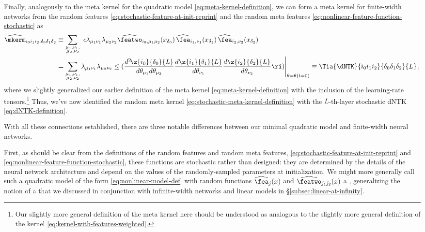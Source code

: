 Finally, analogously to the meta kernel for the quadratic model \eqref{eq:meta-kernel-definition}, we can form a meta kernel for finite-width networks from the random features  \eqref{eq:stochastic-feature-at-init-reprint} and the random meta features \eqref{eq:nonlinear-feature-function-stochastic} as
\begin{align}\label{eq:stochastic-meta-kernel-definition}
\widehat{\mkerm}_{i_0 i_1 i_2; \delta_0\delta_1\delta_2} &\equiv \sum_{\substack{\mu_1,\nu_1, \\ \mu_2,\nu_2} }\ \epsilon \lambda_{\mu_1\nu_1}\lambda_{\mu_2\nu_2} \widehat{\featwo}_{i_0,\mu_1\mu_2}(x_{\delta_0})\, \widehat{\fea}_{i_1,\nu_1}(x_{\delta_1} ) \,\widehat{\fea}_{i_2,\nu_2}(x_{\delta_2}) \\
&=\sum_{\substack{\mu_1,\nu_1, \\ \mu_2,\nu_2} }\lambda_{\mu_1\nu_1}\lambda_{\mu_2\nu_2}\le( \frac{d^2\!\z{i_0}{\delta_0}{L}}{d\theta_{\mu_1}d\theta_{\mu_2}}\frac{d\z{i_1}{\delta_1}{L}}{d\theta_{\nu_1}}\frac{d\z{i_2}{\delta_2}{L}}{d\theta_{\nu_2}}\ri)\Bigg|_{\theta=\theta(t=0) } \equiv \Tia{\dNTK}{i_0i_1i_2}{\delta_0 \delta_1\delta_2}{L} \, , \notag
\end{align}
where we slightly generalized our earlier definition of the meta kernel \eqref{eq:meta-kernel-definition} with the inclusion of the learning-rate tensors.\footnote{
Our slightly more general definition of the meta kernel here should be understood as analogous to the slightly more general definition of the kernel \eqref{eq:kernel-with-features-weighted}.}
Thus, we've now identified the random meta kernel \eqref{eq:stochastic-meta-kernel-definition}  with the $L$-th-layer stochastic dNTK \eqref{eq:dNTK-definition}.







With all these connections established, there are three notable differences between our minimal quadratic model and finite-width neural networks.  




First, as should be clear from the definitions of the random features and random meta features, \eqref{eq:stochastic-feature-at-init-reprint} and \eqref{eq:nonlinear-feature-function-stochastic}, these functions are stochastic rather than designed: they are determined by the details of the neural network architecture and depend on the values of the randomly-sampled parameters at initialization. We might more generally call such a quadratic model of the form \eqref{eq:nonlinear-model-def} with random functions $\widehat{\fea}_j(x)$ and $\widehat{\featwo}_{j_1j_2}(x)$ a , generalizing the notion of a  that we discussed in conjunction with infinite-width networks and linear models in \S\ref{subsec:linear-at-infinity}.




